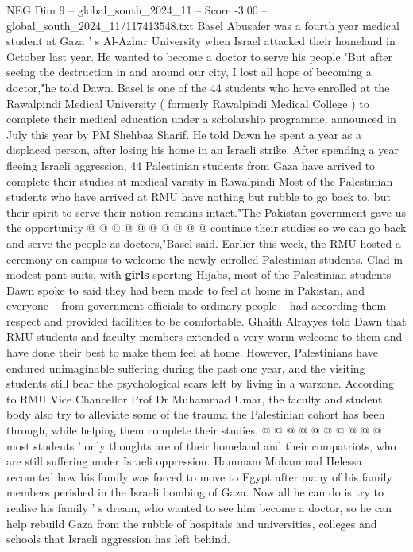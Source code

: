 \begin{textsample}{NEG Dim 9 – global\_south\_2024\_11 – Score -3.00 – global\_south\_2024\_11/117413548.txt}  \label{ex:f9_neg_418}
Basel Abusafer was a fourth year medical student at Gaza ' s Al-Azhar University when Israel attacked their homeland in October last year.
He wanted to become a doctor to serve his people."But after seeing the destruction in and around our city, I lost all hope of becoming a doctor,"he told Dawn.
Basel is one of the 44 students who have enrolled at the Rawalpindi Medical University ( formerly Rawalpindi Medical College ) to complete their medical education under a scholarship programme, announced in July this year by PM Shehbaz Sharif.
He told Dawn he spent a year as a displaced person, after losing his home in an Israeli strike.
After spending a year fleeing Israeli aggression, 44 Palestinian students from Gaza have arrived to complete their studies at medical varsity in Rawalpindi Most of the Palestinian students who have arrived at RMU have nothing but rubble to go back to, but their spirit to serve their nation remains intact."The Pakistan government gave us the opportunity @ @ @ @ @ @ @ @ @ @ continue their studies so we can go back and serve the people as doctors,"Basel said.
Earlier this week, the RMU hosted a ceremony on campus to welcome the newly-enrolled Palestinian students.
Clad in modest pant suits, with \textbf{girls} sporting Hijabs, most of the Palestinian students Dawn spoke to said they had been made to feel at home in Pakistan, and everyone -- from government officials to ordinary people -- had according them respect and provided facilities to be comfortable.
Ghaith Alrayyes told Dawn that RMU students and faculty members extended a very warm welcome to them and have done their best to make them feel at home.
However, Palestinians have endured unimaginable suffering during the past one year, and the visiting students still bear the psychological scars left by living in a warzone.
According to RMU Vice Chancellor Prof Dr Muhammad Umar, the faculty and student body also try to alleviate some of the trauma the Palestinian cohort has been through, while helping them complete their studies. @ @ @ @ @ @ @ @ @ @ most students ' only thoughts are of their homeland and their compatriots, who are still suffering under Israeli oppression.
Hammam Mohammad Helessa recounted how his family was forced to move to Egypt after many of his family members perished in the Israeli bombing of Gaza.
Now all he can do is try to realise his family ' s dream, who wanted to see him become a doctor, so he can help rebuild Gaza from the rubble of hospitals and universities, colleges and schools that Israeli aggression has left behind.

\end{textsample}
